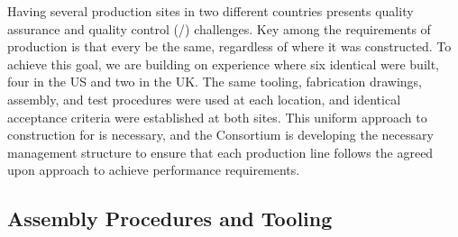 Having several  production sites in two different countries presents quality assurance and quality control (/) challenges. Key among the requirements of production is that every  be the same, regardless of where it was constructed. To achieve this goal, we are building on  experience where six identical  were built, four in the US and two in the UK. The same tooling, fabrication drawings, assembly, and test procedures were used at each location, and identical acceptance criteria were established at both sites.  This uniform approach to construction for  is necessary, and the  Consortium is developing the necessary management structure to ensure that each production line follows the agreed upon approach to achieve  performance requirements.


\subsection{Assembly Procedures and Tooling}
\label{sec:fdsp-apa-prod-tooling}


